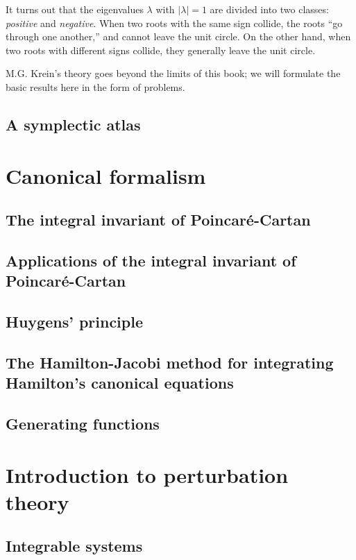 \documentclass[leqno]{book}
\numberwithin{equation}{section}
\theoremstyle{plain}
\theoremstyle{definition}
\theoremstyle{remark}
\theoremstyle{smallcap}
\numberwithin{prob}{section}
\begin{document}
It turns out that the eigenvalues $\lambda$ with $|\lambda| = 1$
are divided into two classes:
\emph{positive} and \emph{negative}.
%
When two roots with the same sign collide,
the roots ``go through one another,''
and cannot leave the unit circle.
%
On the other hand,
when two roots with different signs collide,
they generally leave the unit circle.

M.G. Krein's theory goes beyond the limits of this book;
we will formulate the basic results here in the form of problems.




\section{A symplectic atlas}

\chapter{Canonical formalism}

\section{The integral invariant of Poincar\'e-Cartan}

\section{Applications of the integral invariant of Poincar\'e-Cartan}

\section{Huygens' principle}

\section{The Hamilton-Jacobi method for integrating Hamilton's canonical equations}

\section{Generating functions}

\chapter{Introduction to perturbation theory}

\section{Integrable systems}
\end{document}
